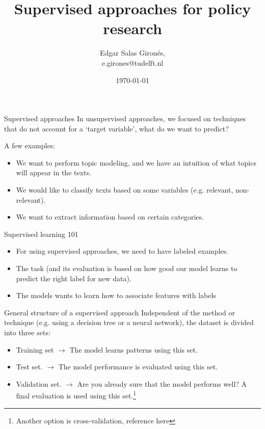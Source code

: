 \documentclass{beamer}
\title{Supervised approaches for policy research}
\author[E Salas Gironés]{Edgar Salas Gironés, \\ e.girones@tudelft.nl}
\date{\today}
\begin{document}
\begin{frame}
  \titlepage
\end{frame}

\begin{frame}{Supervised approaches}
    In unsupervised approaches, we focused on techniques that do not account for a `target variable', what do we want to predict?

    \vspace{0.5cm}
    A few examples:

    \begin{itemize}
        \item We want to perform topic modeling, and we have an intuition of what topics will appear in the texts.
        \item We would like to classify texts based on some variables (e.g. relevant, non-relevant).
        \item We want to extract information based on certain categories.
    \end{itemize}
\end{frame}

\begin{frame}{Supervised learning 101}
    \begin{itemize}
        \item For using supervised approaches, we need to have labeled examples.
        \item The task (and its evaluation is based on how good our model learns to predict the right label for new data).
        \item The models wants to learn how to associate features with labels
    \end{itemize}
\end{frame}

\begin{frame}{General structure of a supervised approach}
    Independent of the method or technique (e.g. using a decision tree or a neural network), the dataset is divided into three sets:
    \vspace{0.5cm}
    
    \begin{itemize}
        \item Training set $\rightarrow$  The model learns patterns using this set.
        \item Test set. $\rightarrow$  The model performance is evaluated using this set.
        \item Validation set. $\rightarrow$ Are you already sure that the model performs well? A final evaluation is used using this set.\footnote{Another option is cross-validation, reference here}
    \end{itemize}
    
    \vspace{0.5cm}

\end{frame}
\end{document}
